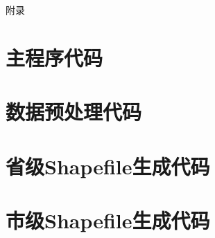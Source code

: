 \documentclass[14pt,a4paper,UTF8,twoside]{article}
\begin{document}
\begin{center}
	\heiti{} 附\hspace{1pc}录
\end{center}

\section{主程序代码}


\section{数据预处理代码}


\section{省级Shapefile生成代码}


\section{市级Shapefile生成代码}

\end{document}
